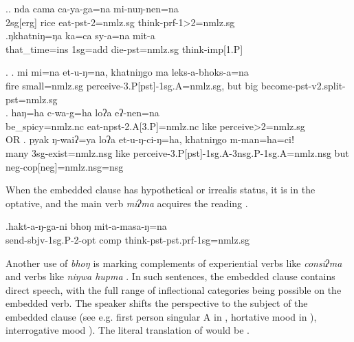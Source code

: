 \ex.\ag. nda cama ca-ya-ga=na mi-nuŋ-nen=na\\
{\sc 2sg[erg]} rice eat-{\sc pst-2=nmlz.sg} think-{\sc prf-1>2=nmlz.sg}\\
\bg.ŋkhatniŋ=ŋa ka=ca sy-a=na mit-a\\
that\_time{\sc =ins} {\sc 1sg=add} die{\sc [3sg]-pst=nmlz.sg} think{\sc -imp[1.P]}\\
 
	

\ex. \ag. mi mi=na et-u-ŋ=na, khatniŋgo ma leks-a-bhoks-a=na\\
	fire small{\sc =nmlz.sg} perceive{\sc -3.P[pst]-1sg.A=nmlz.sg}, but big become{\sc [3sg]-pst-v2.split-pst=nmlz.sg}	\\
	\bg. haŋ=ha c-wa-g=ha loʔa eʔ-nen=na\\
be\_spicy{\sc =nmlz.nc} eat-{\sc npst-2.A[3.P]=nmlz.nc} like perceive{>2=nmlz.sg}  \\
 OR
\bg. pyak ŋ-waiʔ=ya loʔa et-u-ŋ-ci-ŋ=ha, khatniŋgo m-man=ha=ciǃ\\
many {\sc 3sg-}exist{\sc =nmlz.nsg} like perceive{\sc -3.P[pst]-1sg.A-3nsg.P-1sg.A=nmlz.nsg} but {\sc neg-cop[neg]=nmlz.nsg=nsg}\\


When the embedded clause has hypothetical or irrealis status, it is in the optative,  and the main verb \emph{miʔma}  acquires the reading .

\exg.hakt-a-ŋ-ga-ni bhoŋ mit-a-masa-ŋ=na\\
send{\sc -sbjv-1sg.P-2-opt} {\sc comp} think{\sc -pst-pst.prf-1sg=nmlz.sg}\\


Another use of \emph{bhoŋ} is marking complements of experiential verbs like \emph{consiʔma}  and verbs like \emph{niŋwa hupma} . In such sentences, the embedded clause contains direct speech, with the full range of inflectional categories being possible on the embedded verb. The speaker shifts the perspective to the subject of the embedded clause (see e.g. first person singular A in \Next[a], hortative mood in \Next[b]), interrogative mood \Next[c]).  The literal translation of \Next[a] would be . 
 
